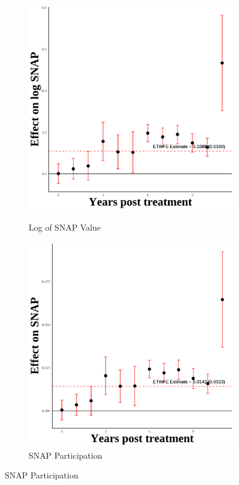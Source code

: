 \documentclass[12pt,english]{article}
\begin{document}
\begin{figure}[H]
  \begin{subfigure}[b]{0.3\textwidth}
    \centering
    \caption{Log of SNAP Value}
    \includegraphics[width=\linewidth]{figures/plot04-ln_snap_event_study.png}
    \label{fig:ln-snap}
  \end{subfigure}
  \hfill
  \begin{subfigure}[b]{0.3\textwidth}
    \centering
    \caption{SNAP Participation}
    \includegraphics[width=\linewidth]{figures/plot05-snap_event_study.png}

\end{subfigure}
\end{figure}
\end{document}
